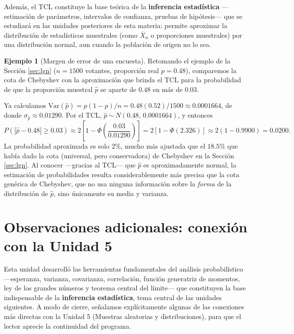 \documentclass[11pt,a4paper]{article}
\theoremstyle{plain}
\theoremstyle{definition}
\newtheorem{ejemplo}[teorema]{Ejemplo}
\theoremstyle{remark}
\begin{document}
Además, el TCL constituye la base teórica de la \textbf{inferencia estadística} —estimación de parámetros, intervalos de confianza, pruebas de hipótesis— que se estudiará en las unidades posteriores de esta materia: permite aproximar la distribución de estadísticos muestrales (como $\overline{X}_n$ o proporciones muestrales) por una distribución normal, aun cuando la población de origen no lo sea.

\begin{ejemplo}[Margen de error de una encuesta]
Retomando el ejemplo de la Sección \ref{sec:lgn} ($n=1500$ votantes, proporción real $p=0.48$), comparemos la cota de Chebyshev con la aproximación que brinda el TCL para la probabilidad de que la proporción muestral $\hat p$ se aparte de $0.48$ en más de $0.03$.

Ya calculamos $\text{Var}(\hat p)=p(1-p)/n = 0.48(0.52)/1500 \approx 0.0001664$, de donde $\sigma_{\hat p}\approx0.01290$. Por el TCL, $\hat p\ \dot\sim\ N(0.48,\,0.0001664)$, y entonces
\[
P(|\hat p-0.48|\geq0.03) \approx 2\left[1-\Phi\left(\frac{0.03}{0.01290}\right)\right] = 2[1-\Phi(2.326)] \approx 2(1-0.9900) = 0.0200.
\]
La probabilidad aproximada es solo $2\%$, mucho más ajustada que el $18.5\%$ que había dado la cota (universal, pero conservadora) de Chebyshev en la Sección \ref{sec:lgn}. Al conocer —gracias al TCL— que $\hat p$ es aproximadamente normal, la estimación de probabilidades resulta considerablemente más precisa que la cota genérica de Chebyshev, que no usa ninguna información sobre la \emph{forma} de la distribución de $\hat p$, sino únicamente su media y varianza.
\end{ejemplo}

\newpage
\section{Observaciones adicionales: conexión con la Unidad 5}

Esta unidad desarrolló las herramientas fundamentales del análisis probabilístico —esperanza, varianza, covarianza, correlación, función generatriz de momentos, ley de los grandes números y teorema central del límite— que constituyen la base indispensable de la \textbf{inferencia estadística}, tema central de las unidades siguientes. A modo de cierre, señalamos explícitamente algunas de las conexiones más directas con la Unidad 5 (Muestras aleatorias y distribuciones), para que el lector aprecie la continuidad del programa.
\end{document}
